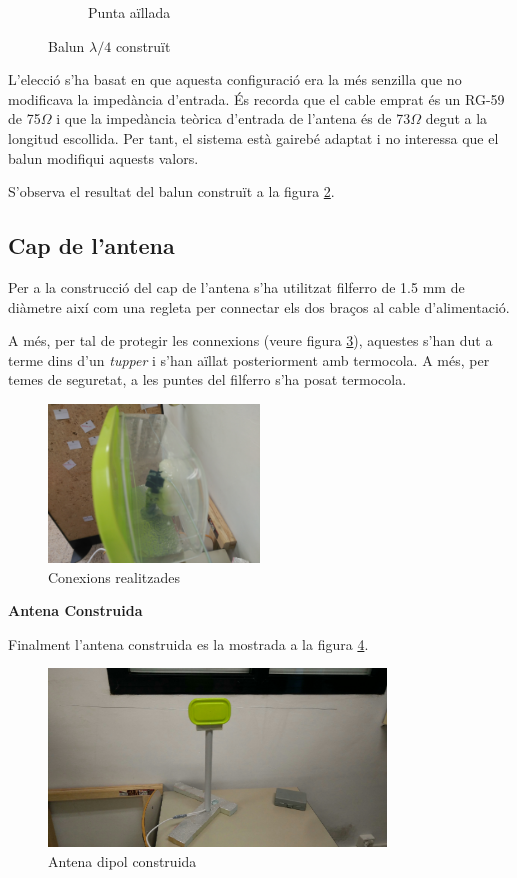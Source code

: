 \begin{figure}[H]
\begin{subfigure}{.5\textwidth}
	\caption{Punta aïllada}
	\label{balun2}
\end{subfigure}
\caption{Balun $\lambda/4$ construït}
\label{baluncons}
\end{figure}

L'elecció s'ha basat en que aquesta configuració era la més senzilla que no modificava la impedància d'entrada. És recorda que el cable emprat és un RG-59 de 75$\Omega$ i que la impedància teòrica d'entrada de l'antena és de 73$\Omega$ degut a la longitud escollida. Per tant, el sistema està gairebé adaptat i no interessa que el balun modifiqui aquests valors.

S'observa el resultat del balun construït a la figura \ref{baluncons}.


\subsection{Cap de l'antena}

Per a la construcció del cap de l'antena s'ha utilitzat filferro de 1.5 mm de diàmetre així com una regleta per connectar els dos braços al cable d'alimentació.

A més, per tal de protegir les connexions (veure figura \ref{Conexions}), aquestes s'han dut a terme dins d'un \textit{tupper} i s'han aïllat posteriorment amb termocola. A més, per temes de seguretat, a les puntes del filferro s'ha posat termocola. %

\begin{figure}[H]
\centering
\includegraphics[width=0.5\textwidth]{./images/Conexions}
\caption{Conexions realitzades}
\label{Conexions}
\end{figure}



\textbf{Antena Construida}

Finalment l'antena construida es la mostrada a la figura \ref{AntenaFinal}.

\begin{figure}[H]
\centering
\includegraphics[width=0.8\textwidth]{./images/Antena_final}
\caption{Antena dipol construida}
\label{AntenaFinal}
\end{figure}